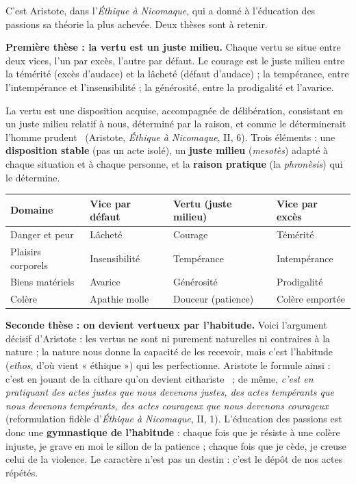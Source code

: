 \documentclass[11pt]{article}
\newcommand{\cle}[1]{{\popxbold\color{popdark}#1}}
\begin{document}
C'est Aristote, dans l'\emph{Éthique à Nicomaque}, qui a donné à l'éducation des passions sa théorie la plus achevée. Deux thèses sont à retenir.

\textbf{Première thèse : la vertu est un juste milieu.} Chaque vertu se situe entre deux vices, l'un par excès, l'autre par défaut. Le courage est le juste milieu entre la témérité (excès d'audace) et la lâcheté (défaut d'audace) ; la tempérance, entre l'intempérance et l'insensibilité ; la générosité, entre la prodigalité et l'avarice.

\begin{definition}
La \cle{vertu} est \guillemotleft une disposition acquise, accompagnée de délibération, consistant en un juste milieu relatif à nous, déterminé par la raison, et comme le déterminerait l'homme prudent \guillemotright\ (Aristote, \emph{Éthique à Nicomaque}, II, 6). Trois éléments : une \textbf{disposition stable} (pas un acte isolé), un \textbf{juste milieu} (\emph{mesotès}) adapté à chaque situation et à chaque personne, et la \textbf{raison pratique} (la \emph{phronèsis}) qui le détermine.
\end{definition}

\begin{center}
\begin{tabularx}{\linewidth}{|l|X|X|X|}
\hline
\rowcolor{popblueL}
\textbf{Domaine} & \textbf{Vice par défaut} & \textbf{Vertu (juste milieu)} & \textbf{Vice par excès} \\
\hline
Danger et peur & Lâcheté & Courage & Témérité \\
\hline
Plaisirs corporels & Insensibilité & Tempérance & Intempérance \\
\hline
Biens matériels & Avarice & Générosité & Prodigalité \\
\hline
Colère & Apathie molle & Douceur (patience) & Colère emportée \\
\hline
\end{tabularx}
\end{center}

\textbf{Seconde thèse : on devient vertueux par l'habitude.} Voici l'argument décisif d'Aristote : les vertus ne sont ni purement naturelles ni contraires à la nature ; la nature nous donne la capacité de les recevoir, mais c'est l'\cle{habitude} (\emph{ethos}, d'où vient « éthique ») qui les perfectionne. Aristote le formule ainsi : \guillemotleft c'est en jouant de la cithare qu'on devient cithariste \guillemotright\ ; de même, \emph{c'est en pratiquant des actes justes que nous devenons justes, des actes tempérants que nous devenons tempérants, des actes courageux que nous devenons courageux} (reformulation fidèle d'\emph{Éthique à Nicomaque}, II, 1). L'éducation des passions est donc une \textbf{gymnastique de l'habitude} : chaque fois que je résiste à une colère injuste, je grave en moi le sillon de la patience ; chaque fois que je cède, je creuse celui de la violence. Le caractère n'est pas un destin : c'est le dépôt de nos actes répétés.
\end{document}
